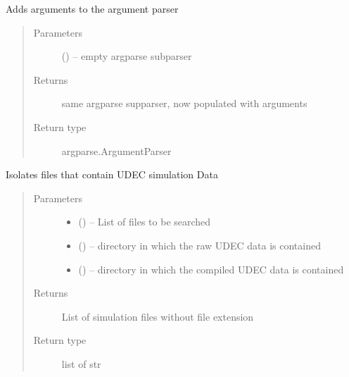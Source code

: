 \documentclass[letterpaper,10pt,english]{sphinxmanual}
\begin{document}

\begin{fulllineitems}
\label{\detokenize{MouseReferenceManual:Modules.Module_UDEC.populateArgumentParser}}
Adds arguments to the argument parser
\begin{quote}\begin{description}
\item[{Parameters}] \leavevmode
{} () -- empty argparse subparser

\item[{Returns}] \leavevmode
same argparse supparser, now populated with arguments

\item[{Return type}] \leavevmode
argparse.ArgumentParser

\end{description}\end{quote}

\end{fulllineitems}


\begin{fulllineitems}
\label{\detokenize{MouseReferenceManual:Modules.Module_UDEC.simulationFiles}}
Isolates files that contain UDEC simulation Data
\begin{quote}\begin{description}
\item[{Parameters}] \leavevmode\begin{itemize}
\item {} 
 () -- List of files to be searched

\item {} 
 () -- directory in which the raw UDEC data is contained

\item {} 
 () -- directory in which the compiled UDEC data is contained

\end{itemize}

\item[{Returns}] \leavevmode
List of simulation files without file extension

\item[{Return type}] \leavevmode
list of str

\end{description}\end{quote}

\end{fulllineitems}
\end{document}
